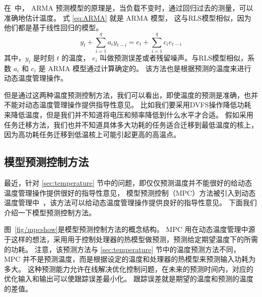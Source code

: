 在~\cite{coskun2008proactive}中，  ARMA 预测模型的原理是，当负载不变时，通过回归过去的测量，可以准确地估计温度。
式  \eqref{eq:ARMA} 就是 ARMA 模型， 这与RLS模型相似，因为他们都是基于线性回归的模型。
\begin{equation}\label{eq:ARMA}
y_t + \sum_{i=1}^qa_iy_{t-i} = e_t +\sum_{i=1}^qc_ie_{t-i}
\end{equation}
其中，$y_t$ 是时刻 $t$ 的温度， $e_i$ 叫做预测误差或者残留噪声。与RLS模型相似，系数 $a_i$ 和 $c_i$ 是 ARMA 模型通过计算确定的。
该方法也是根据预测的温度来进行动态温度管理操作。

但是通过这两种温度预测控制方法，我们可以看出，即使温度的预测是准确，也并不能对动态温度管理操作提供指导性意见。
比如我们要采用DVFS操作降低功耗来降低温度，但是我们并不知道将电压和频率降低到什么水平才合适。 
假如采用任务迁移方法，我们也并不知道具体多大功耗的任务适合迁移到最低温度的核上，因为高功耗任务迁移到低温核上可能引起更高的高温点。

\subsection{模型预测控制方法}\label{sec:mpc}

最近，针对 \ref{sec:temperature} 节中的问题，即仅仅预测温度并不能很好的给动态温度管理操作提供很好的指导性意见，
模型预测控制（MPC）方法被引入到动态温度管理中~\cite{Zanini:ECCTD'09}，该方法可以给动态温度管理操作提供良好的指导性意见。
下面我们介绍一下模型预测控制方法。

图~\ref{fig/mpcshow}是模型预测控制方法的概念结构。 MPC 用在动态温度管理中源于这样的想法，采用用于控制处理器的热模型做预测，预测给定期望温度下的所需的功耗。
注意，该预测方法与 \ref{sec:temperature} 节中的温度预测方法不同， MPC 并不是预测温度，而是根据设定的温度和处理器的热模型来预测输入功耗为多大。
这种预测能力允许在线解决优化控制问题，在未来的预测时间内，对应的优化输入和输出可以使跟踪误差最小化。 跟踪误差就是期望的温度和预测的温度的差值。

